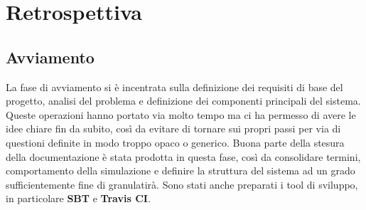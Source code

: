 \section{Retrospettiva}

\subsection{Avviamento}
La fase di avviamento si è incentrata sulla definizione dei requisiti di base del progetto, analisi del problema e definizione dei componenti principali del sistema. Queste operazioni hanno portato via molto tempo ma ci ha permesso di avere le idee chiare fin da subito, così da evitare di tornare sui propri passi per via di questioni definite in modo troppo opaco o generico. Buona parte della stesura della documentazione è stata prodotta in questa fase, così da consolidare termini, comportamento della simulazione e definire la struttura del sistema ad un grado sufficientemente fine di granulatirà. Sono stati anche preparati i tool di sviluppo, in particolare \textbf{SBT} e \textbf{Travis CI}.